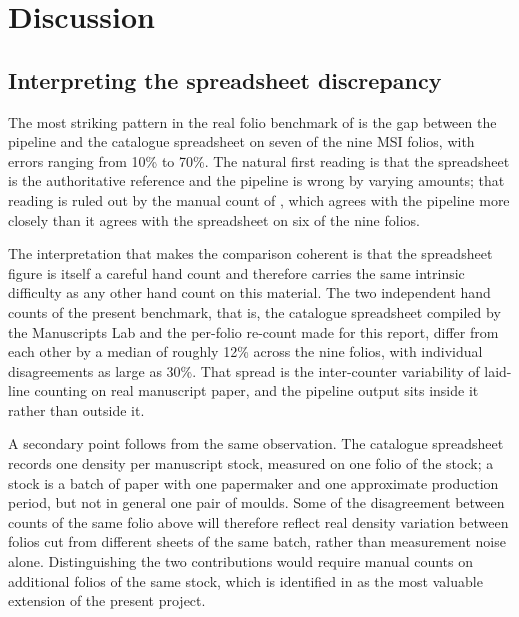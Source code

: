 \section{Discussion}
\label{sec:discussion}


\subsection{Interpreting the spreadsheet discrepancy}
\label{sec:discussion:spreadsheet}

The most striking pattern in the real folio benchmark of
 is the gap between the pipeline and the
catalogue spreadsheet on seven of the nine MSI folios, with
errors ranging from 10\% to 70\%. The natural first
reading is that the spreadsheet is the authoritative reference
and the pipeline is wrong by varying amounts; that reading is
ruled out by the manual count of
, which agrees with the pipeline
more closely than it agrees with the spreadsheet on six of the
nine folios.

The interpretation that makes the comparison coherent is that the
spreadsheet figure is itself a careful hand count and therefore
carries the same intrinsic difficulty as any other hand count on
this material. The two independent hand counts of the present
benchmark, that is, the catalogue spreadsheet compiled by the
Manuscripts Lab and the per-folio re-count made for this report,
differ from each other by a median of roughly 12\%
across the nine folios, with individual disagreements as large as
30\%. That spread is the inter-counter variability of
laid-line counting on real manuscript paper, and the pipeline
output sits inside it rather than outside it.

A secondary point follows from the same observation. The
catalogue spreadsheet records one density per manuscript stock,
measured on one folio of the stock; a stock is a batch of paper
with one papermaker and one approximate production period, but
not in general one pair of moulds. Some of the 
disagreement between counts of the same folio above will therefore reflect real
density variation between folios cut from different sheets of the
same batch, rather than measurement noise alone. Distinguishing
the two contributions would require manual counts on additional
folios of the same stock, which is identified in
 as the most valuable extension of
the present project.

